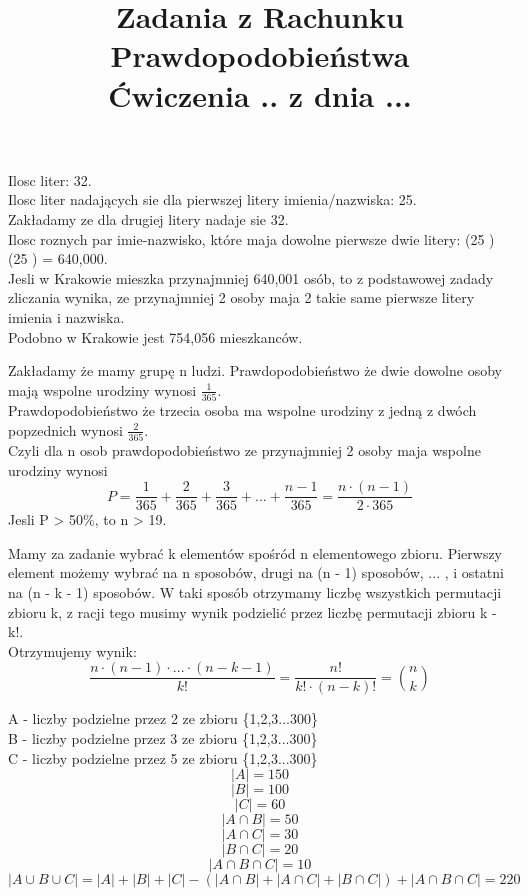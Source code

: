 \documentclass[fleqn]{article}
\begin{document}
\title{Zadania z Rachunku Prawdopodobieństwa \\ Ćwiczenia .. z dnia ...}
\date{}
\medskip
{}
\medskip

Ilosc liter: 32. \\
Ilosc liter nadających sie dla pierwszej litery imienia/nazwiska: 25. \\
Zakładamy ze dla drugiej litery nadaje sie 32. \\
Ilosc roznych par imie-nazwisko, które maja dowolne pierwsze dwie litery: (25 ) \cdot (25 ) = 640,000. \\
Jesli w Krakowie mieszka przynajmniej 640,001 osób, to z podstawowej zadady zliczania wynika, ze przynajmniej 2 osoby maja 2 takie same pierwsze litery imienia i nazwiska. \\
Podobno w Krakowie jest 754,056 mieszkanców. \\
\medskip
{}
\medskip

Zakładamy że mamy grupę n ludzi.
Prawdopodobieństwo że dwie dowolne osoby mają wspolne urodziny wynosi $\frac{1}{365}$.\\
Prawdopodobieństwo że trzecia osoba ma wspolne urodziny z jedną z dwóch popzednich wynosi $\frac{2}{365}$.\\
Czyli dla n osob prawdopodobieństwo ze przynajmniej 2 osoby maja wspolne urodziny wynosi
\[P = \frac{1}{365} + \frac{2}{365} + \frac{3}{365} + ... + \frac{n - 1}{365} = \frac{n\cdot(n-1)}{2\cdot365}\]
Jesli P > 50\%, to n > 19.
\medskip

\medskip

Mamy za zadanie wybrać k elementów spośród n elementowego zbioru. Pierwszy element możemy wybrać na n sposobów, drugi na (n - 1) sposobów, ... , i ostatni na (n - k - 1) sposobów. W taki sposób otrzymamy liczbę wszystkich permutacji zbioru k, z racji tego musimy wynik podzielić przez liczbę permutacji zbioru k - k!.\\
Otrzymujemy wynik:\\
\[\frac{n\cdot(n-1)\cdot...\cdot(n-k-1)}{k!} = \frac{n!}{k!\cdot(n-k)!}={n \choose k}\]

\medskip


\medskip

A - liczby podzielne przez 2 ze zbioru \{1,2,3...300\}\\
B - liczby podzielne przez 3 ze zbioru \{1,2,3...300\}\\
C - liczby podzielne przez 5 ze zbioru \{1,2,3...300\}\\
\[|A| = 150\]
\[|B| = 100\]
\[|C| = 60 \]
\[|A \cap B| = 50\]
\[|A \cap C| = 30\]
\[|B \cap C| = 20\]
\[|A \cap B \cap C| = 10\]
\[|A \cup B \cup C| = |A| + |B| + |C| - (|A \cap B|  + |A \cap C| + |B \cap C|) + |A \cap B \cap C| = 220 \]
\end{document}
